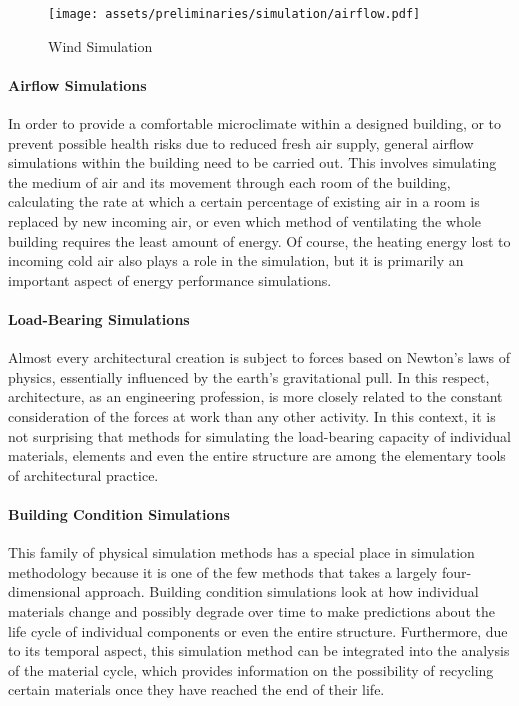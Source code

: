 \documentclass[a4paper, 12pt]{report}
\begin{document}
\begin{figure}
\centering
\texttt{[image: assets/preliminaries/simulation/airflow.pdf]}
\caption{Wind Simulation}
\label{fig:wind-simulation}
\end{figure}

\paragraph{Airflow Simulations}\label{par:airflow-simulations}

In order to provide a comfortable microclimate within a designed building, or to prevent possible health risks due to reduced fresh air supply, general airflow simulations within the building need to be carried out. This involves simulating the medium of air and its movement through each room of the building, calculating the rate at which a certain percentage of existing air in a room is replaced by new incoming air, or even which method of ventilating the whole building requires the least amount of energy. Of course, the heating energy lost to incoming cold air also plays a role in the simulation, but it is primarily an important aspect of energy performance simulations.

\paragraph{Load-Bearing Simulations}\label{par:load-bearing-simulations}

Almost every architectural creation is subject to forces based on Newton's laws of physics, essentially influenced by the earth's gravitational pull. In this respect, architecture, as an engineering profession, is more closely related to the constant consideration of the forces at work than any other activity. In this context, it is not surprising that methods for simulating the load-bearing capacity of individual materials, elements and even the entire structure are among the elementary tools of architectural practice.

\paragraph{Building Condition Simulations}\label{par:building-condition-simulations}

This family of physical simulation methods has a special place in simulation methodology because it is one of the few methods that takes a largely four-dimensional approach. Building condition simulations look at how individual materials change and possibly degrade over time to make predictions about the life cycle of individual components or even the entire structure. Furthermore, due to its temporal aspect, this simulation method can be integrated into the analysis of the material cycle, which provides information on the possibility of recycling certain materials once they have reached the end of their life.
\end{document}
